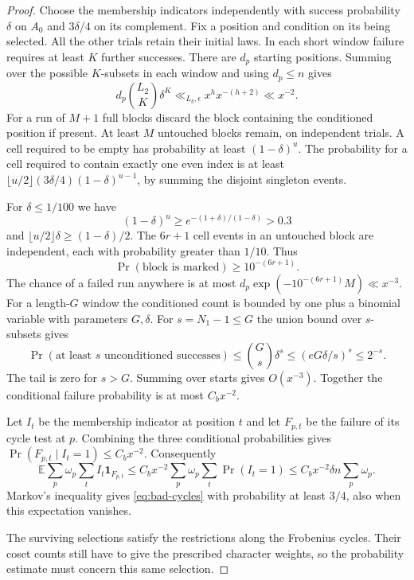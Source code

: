 \begin{proof}
Choose the membership indicators independently with success
probability \(\delta\) on \(A_0\) and \(3\delta/4\) on
its complement. Fix a position and condition on its being
selected. All the other trials retain their initial laws.
In each short window failure requires at least \(K\) further
successes. There are \(d_p\) starting positions. Summing over the possible \(K\)-subsets in each window and using \(d_p\le n\) gives
\[
 d_p\binom{L_2}{K}\delta^K\ll_{L_b,\epsilon}x^{h}x^{-(h+2)}\ll x^{-2}.
\]
For a run of \(M+1\) full
blocks discard the block containing the conditioned position
if present. At least \(M\) untouched blocks remain, on
independent trials. A cell required to be empty has
probability at least \((1-\delta)^u\). The probability for
a cell required to contain exactly one even index is at least
\(\lfloor u/2\rfloor(3\delta/4)(1-\delta)^{u-1}\), by
summing the disjoint singleton events.

For \(\delta\le1/100\)
we have
\[
 (1-\delta)^u\ge e^{-(1+\delta)/(1-\delta)}>0.3
\]
and \(\lfloor u/2\rfloor\delta\ge(1-\delta)/2\).
The \(6r+1\) cell events in an untouched block are independent, each with probability greater than \(1/10\). Thus
\[
 \Pr(\text{block is marked})\ge10^{-(6r+1)}.
\]
The
chance of a failed run anywhere is at most
\(d_p\exp(-10^{-(6r+1)} M)\ll x^{-3}\).
For a length-\(G\) window the conditioned count is bounded
by one plus a binomial variable with parameters \(G,\delta\).
For \(s=N_1-1\le G\) the union bound over \(s\)-subsets gives
\[
 \Pr(\text{at least }s\text{ unconditioned successes})\le \binom{G}{s}\delta^s\le(eG\delta/s)^s\le2^{-s}.
\]
The tail is zero for \(s>G\).
Summing over starts gives \(O(x^{-3})\). Together the
conditional failure probability is at most \(C_bx^{-2}\).

Let \(I_t\) be the membership indicator at position \(t\)
and let \(F_{p,t}\) be the failure of its cycle test at \(p\).
Combining the three conditional probabilities gives
\(\Pr(F_{p,t}\mid I_t=1)\le C_bx^{-2}\). Consequently
\[
 \mathbb E\sum_p \omega_p\sum_t I_t\mathbf1_{F_{p,t}}
   \le C_bx^{-2}\sum_p\omega_p\sum_t\Pr(I_t=1)
   \le C_b x^{-2}\delta n\sum_p\omega_p .
\]
Markov's inequality gives \eqref{eq:bad-cycles} with
probability at least \(3/4\), also when this expectation vanishes.

The surviving selections satisfy the restrictions along the Frobenius cycles. Their coset counts still have to give the prescribed character weights, so the probability estimate must concern this same selection.


\end{proof}
